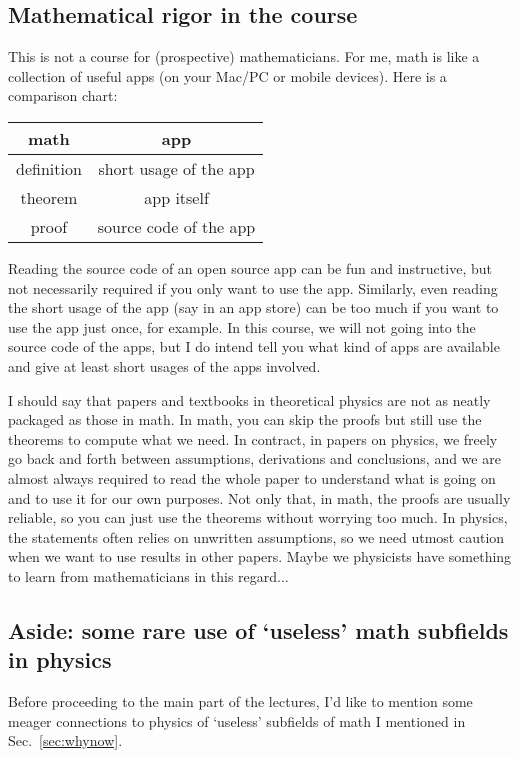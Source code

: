 \documentclass[12pt]{article}
\numberwithin{equation}{section}
\begin{document}
\subsection{Mathematical rigor in the course}
This is not a course for (prospective) mathematicians. 
For me, math is like a collection of useful apps (on your Mac/PC or mobile devices).
Here is a comparison chart:
\begin{center}
\begin{tabular}{|c|c|}
  \hline
  math & app \\
  \hline
  definition & short usage of the app \\
  theorem & app itself \\
  proof & source code of the app \\
  \hline
\end{tabular}
\end{center}
Reading the source code of an open source app can be fun and instructive,
but not necessarily required if you only want to use the app. 
Similarly, even reading the short usage of the app (say in an app store) can be too much 
if you want to use the app just once, for example.
In this course, we will not going into the source code of the apps,
but I do intend tell you what kind of apps are available
and give at least short usages of the apps involved.

I should say that papers and textbooks in theoretical physics are not as neatly packaged as those in math.
In math, you can skip the proofs but still use the theorems to compute what we need.
In contract, in papers on physics, we freely go back and forth between assumptions, derivations and conclusions,
and we are almost always required to read the whole paper to understand what is going on and to use it for our own purposes.
Not only that, in math, the proofs are usually reliable, so you can just use the theorems without worrying too much.
In physics, the statements often relies on unwritten assumptions, so we need utmost caution when we want 
to use results in other papers. 
Maybe we physicists have something to learn from mathematicians in this regard...


\subsection{Aside: some rare use of `useless' math subfields in physics}
Before proceeding to the main part of the lectures,
I'd like to mention some meager connections to physics of `useless' subfields of math I mentioned in Sec.~\ref{sec:whynow}.
\end{document}
